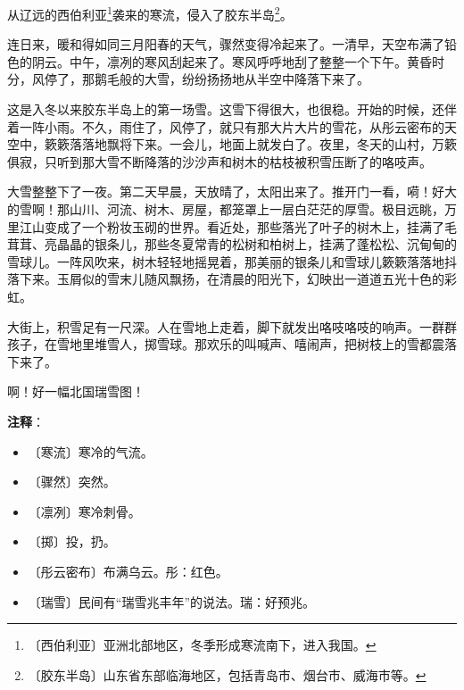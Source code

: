 \documentclass[12pt,UTF-8,openany]{ctexbook}
\begin{document}
\begin{Large}
    
    从辽远的西伯利亚\footnote{〔西伯利亚〕亚洲北部地区，冬季形成寒流南下，进入我国。}袭来的寒流，侵入了胶东半岛\footnote{〔胶东半岛〕山东省东部临海地区，包括青岛市、烟台市、威海市等。}。
    
    连日来，暖和得如同三月阳春的天气，骤然变得冷起来了。一清早，天空布满了铅色的阴云。中午，凛冽的寒风刮起来了。寒风呼呼地刮了整整一个下午。黄昏时分，风停了，那鹅毛般的大雪，纷纷扬扬地从半空中降落下来了。
    
    这是入冬以来胶东半岛上的第一场雪。这雪下得很大，也很稳。开始的时候，还伴着一阵小雨。不久，雨住了，风停了，就只有那大片大片的雪花，从彤云密布的天空中，簌簌落落地飘将下来。一会儿，地面上就发白了。夜里，冬天的山村，万簌俱寂，只听到那大雪不断降落的沙沙声和树木的枯枝被积雪压断了的咯吱声。
    
    大雪整整下了一夜。第二天早晨，天放晴了，太阳出来了。推开门一看，嗬！好大的雪啊！那山川、河流、树木、房屋，都笼罩上一层白茫茫的厚雪。极目远眺，万里江山变成了一个粉妆玉砌的世界。看近处，那些落光了叶子的树木上，挂满了毛茸茸、亮晶晶的银条儿，那些冬夏常青的松树和柏树上，挂满了蓬松松、沉甸甸的雪球儿。一阵风吹来，树木轻轻地摇晃着，那美丽的银条儿和雪球儿簌簌落落地抖落下来。玉屑似的雪末儿随风飘扬，在清晨的阳光下，幻映出一道道五光十色的彩虹。
    
    大街上，积雪足有一尺深。人在雪地上走着，脚下就发出咯吱咯吱的响声。一群群孩子，在雪地里堆雪人，掷雪球。那欢乐的叫喊声、嘻闹声，把树枝上的雪都震落下来了。
    
    啊！好一幅北国瑞雪图！
    
\end{Large}


\newpage

\textbf{注释}：

\vspace{-1em}

\begin{itemize}
    \setlength\itemsep{-0.2em}
    \item 〔寒流〕寒冷的气流。
    \item 〔骤然〕突然。
    \item 〔凛冽〕寒冷刺骨。
    \item 〔掷〕投，扔。
    \item 〔彤云密布〕布满乌云。彤：红色。
    \item 〔瑞雪〕民间有“瑞雪兆丰年”的说法。瑞：好预兆。
\end{itemize}
\end{document}
